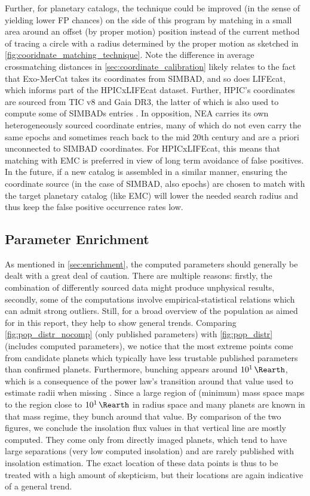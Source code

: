 Further, for planetary catalogs, the technique could be improved (in the sense of yielding lower FP chances) on the side of this program by matching in a small area around an offset (by proper motion) position instead of the current method of tracing a circle with a radius determined by the proper motion as sketched in \cref{fig:cooridnate_matching_technique}.
Note the difference in average crossmatching distances in \cref{sec:coordinate_calibration} likely relates to the fact that Exo-MerCat takes its coordinates from SIMBAD, and so does LIFEcat, which informs part of the HPICxLIFEcat dataset. Further, HPIC's coordinates are sourced from TIC v8 \cite{hpic} and Gaia DR3, the latter of which is also used to compute some of SIMBADs entries \cite{Simbad}. In opposition, NEA carries its own heterogeneously sourced coordinate entries, many of which do not even carry the same epochs and sometimes reach back to the mid 20th century and are a priori unconnected to SIMBAD coordinates. For HPICxLIFEcat, this means that matching with EMC is preferred in view of long term avoidance of false positives. In the future, if a new catalog is assembled in a similar manner, ensuring the coordinate source (in the case of SIMBAD, also epochs) are chosen to match with the target planetary catalog (like EMC) will lower the needed search radius and thus keep the false positive occurrence rates low.
\subsection{Parameter Enrichment}
As mentioned in \cref{sec:enrichment}, the computed parameters should generally be dealt with a great deal of caution. There are multiple reasons: firstly, the combination of differently sourced data might produce unphysical results, secondly, some of the computations involve empirical-statistical relations which can admit strong outliers. Still, for a broad overview of the population as aimed for in this report, they help to show general trends.
Comparing \cref{fig:pop_distr_nocomp} (only published parameters) with \cref{fig:pop_distr} (includes computed parameters), we notice that the most extreme points come from candidate planets which typically have less trustable published parameters than confirmed planets. Furthermore, bunching appears around $\qty{E1}{\Rearth}$, which is a consequence of the \textcite{ChenKipping2017} power law's transition around that value used to estimate radii when missing \cite{NasaExoplanetArchive}. Since a large region of (minimum) mass space maps to the region close to $\qty{E1}{\Rearth}$ in radius space and many planets are known in that mass regime, they bunch around that value. By comparison of the two figures, we conclude the insolation flux values in that vertical line are mostly computed. They come only from directly imaged planets, which tend to have large separations (very low  computed insolation) and are rarely published with insolation estimation. The exact location of these data points is thus to be treated with a high amount of skepticism, but their locations are again indicative of a general trend.
